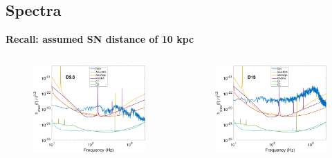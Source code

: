 \documentclass[aspectratio=169]{beamer}
\begin{document}
\subsection{Spectra}

\begin{frame}

  \centerline{\textbf{Recall: assumed SN distance of 10 kpc}}

  \begin{columns}[c]

    \begin{figure}
      \includegraphics[width=1.0\textwidth]{Figures/D9.6_hchar.pdf}
    \end{figure}

    \begin{figure}
      \includegraphics[width=1.0\textwidth]{Figures/D15_hchar.pdf}
    \end{figure}


\end{columns}
\end{frame}
\end{document}
